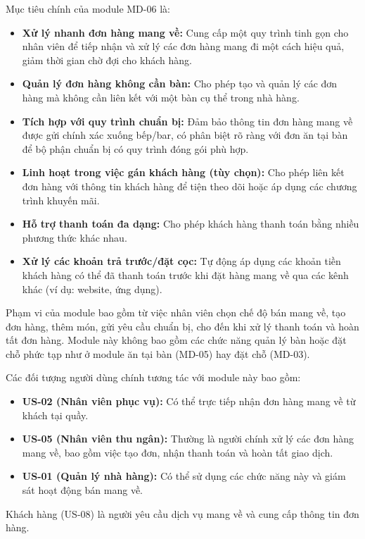 \begin{longtable}{|m{2cm}|m{2.5cm}|m{2.5cm}|m{4.5cm}|m{4cm}|}
\end{longtable}


\label{sssec:md06_objectives_scope}
Mục tiêu chính của module MD-06 là:
\begin{itemize}
    \item \textbf{Xử lý nhanh đơn hàng mang về:} Cung cấp một quy trình tinh gọn cho nhân viên để tiếp nhận và xử lý các đơn hàng mang đi một cách hiệu quả, giảm thời gian chờ đợi cho khách hàng.
    \item \textbf{Quản lý đơn hàng không cần bàn:} Cho phép tạo và quản lý các đơn hàng mà không cần liên kết với một bàn cụ thể trong nhà hàng.
    \item \textbf{Tích hợp với quy trình chuẩn bị:} Đảm bảo thông tin đơn hàng mang về được gửi chính xác xuống bếp/bar, có phân biệt rõ ràng với đơn ăn tại bàn để bộ phận chuẩn bị có quy trình đóng gói phù hợp.
    \item \textbf{Linh hoạt trong việc gán khách hàng (tùy chọn):} Cho phép liên kết đơn hàng với thông tin khách hàng để tiện theo dõi hoặc áp dụng các chương trình khuyến mãi.
    \item \textbf{Hỗ trợ thanh toán đa dạng:} Cho phép khách hàng thanh toán bằng nhiều phương thức khác nhau.
    \item \textbf{Xử lý các khoản trả trước/đặt cọc:} Tự động áp dụng các khoản tiền khách hàng có thể đã thanh toán trước khi đặt hàng mang về qua các kênh khác (ví dụ: website, ứng dụng).
\end{itemize}
Phạm vi của module bao gồm từ việc nhân viên chọn chế độ bán mang về, tạo đơn hàng, thêm món, gửi yêu cầu chuẩn bị, cho đến khi xử lý thanh toán và hoàn tất đơn hàng. Module này không bao gồm các chức năng quản lý bàn hoặc đặt chỗ phức tạp như ở module ăn tại bàn (MD-05) hay đặt chỗ (MD-03).

\label{sssec:md06_primary_users}
Các đối tượng người dùng chính tương tác với module này bao gồm:
\begin{itemize}
    \item \textbf{US-02 (Nhân viên phục vụ):} Có thể trực tiếp nhận đơn hàng mang về từ khách tại quầy.
    \item \textbf{US-05 (Nhân viên thu ngân):} Thường là người chính xử lý các đơn hàng mang về, bao gồm việc tạo đơn, nhận thanh toán và hoàn tất giao dịch.
    \item \textbf{US-01 (Quản lý nhà hàng):} Có thể sử dụng các chức năng này và giám sát hoạt động bán mang về.
\end{itemize}
Khách hàng (US-08) là người yêu cầu dịch vụ mang về và cung cấp thông tin đơn hàng.

